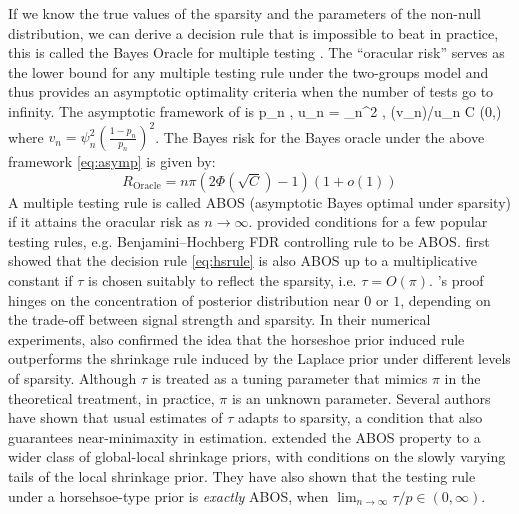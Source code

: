 \documentclass[11pt]{article}
\numberwithin{equation}{section}
\begin{document}
If we know the true values of the sparsity and the parameters of the non-null distribution, we can derive a decision rule that is impossible to beat in practice, this is called the Bayes Oracle for multiple testing \citep{bogdan2011asymptotic}. The ``oracular risk'' serves as the lower bound for any multiple testing rule under the two-groups model and thus provides an asymptotic optimality criteria when the number of tests go to infinity. The asymptotic framework of \citet{bogdan2011asymptotic} is 
\beq
p_n , \; u_n = \psi_n^2 \to \infty, \;  \; \log(v_n)/u_n \to C \in (0,\infty) \label{eq:asymp}
\eeq
where $v_n = \psi_n^2 (\frac{1-p_n}{p_n})^2$. The Bayes risk for the Bayes oracle under the above framework \eqref{eq:asymp} is given by:
\[
R_{\text{Oracle}} = n \pi (2 \Phi(\sqrt{C}) - 1)(1+o(1))
\]
A multiple testing rule is called ABOS (asymptotic Bayes optimal under sparsity) if it attains the oracular risk as $n \to \infty$. \citet{bogdan2011asymptotic} provided conditions for a few popular testing rules, e.g. Benjamini--Hochberg FDR controlling rule to be ABOS. \citet{datta2013asymptotic} first showed that the decision rule \eqref{eq:hsrule} is also ABOS up to a multiplicative constant if $\tau$ is chosen suitably to reflect the sparsity, i.e. $\tau = O(\pi)$. \citet{datta2013asymptotic}'s proof hinges on the concentration of posterior distribution near $0$ or $1$, depending on the trade-off between signal strength and sparsity. In their numerical experiments, \citet{datta2013asymptotic} also confirmed the idea that the horseshoe prior induced rule outperforms the shrinkage rule induced by the Laplace prior under different levels of sparsity. 
Although $\tau$ is treated as a tuning parameter that mimics $\pi$ in the theoretical treatment, in practice, $\pi$ is an unknown parameter. Several authors \cite{datta2013asymptotic, ghosh2016asymptotic, ghosh2016testing,van2016many} have shown that usual estimates of $\tau$ adapts to sparsity, a condition that also guarantees near-minimaxity in estimation. \citet{ghosh2016testing} extended the ABOS property to a wider class of global-local shrinkage priors, with conditions on the slowly varying tails of the local shrinkage prior. They have also shown that the testing rule under a horsehsoe-type prior is \textit{exactly} ABOS, when $\lim_{n \to \infty} \tau/p \in (0, \infty)$. 


\end{document}
